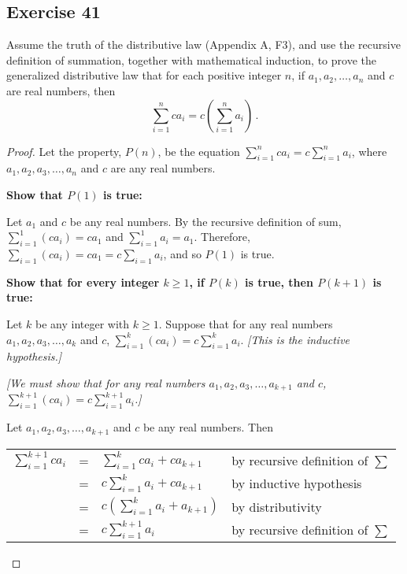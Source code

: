 \documentclass[14pt]{extarticle}
\newcommand{\dps}{\displaystyle}
\newcommand{\cy}{\color{cyan}}
\begin{document}
    \subsection{Exercise 41}
    Assume the truth of the distributive law (Appendix A, F3), and use the recursive definition of summation, together with mathematical induction, to prove the generalized distributive law that for each positive integer $n$, if $a_1, a_2, \ldots, a_n$ and $c$ are real numbers, then
    \[
        \sum_{i = 1}^{n} c a_i = c\left(\sum_{i = 1}^{n} a_i \right)\,.
    \]
    \begin{proof}
        Let the property, $P(n)$, be the equation \(\dps \sum_{i=1}^n c a_i = c\sum_{i=1}^n a_i\), where \(a_1, a_2, a_3,
        \ldots, a_n\) and $c$ are any real numbers.

            {\bf Show that $P(1)$ is true:}

        Let $a_1$ and $c$ be any real numbers. By the recursive
        definition of sum, \(\dps \sum_{i=1}^1 (c a_i) = c a_1\)
        and \(\dps \sum_{i=1}^1 a_i = a_1\). Therefore, \(\dps \sum_{i=1} (c a_i) = c a_1 = c \sum_{i=1} a_i\),
        and so $P(1)$ is true.

            {\bf Show that for every integer \(k \geq 1\), if $P(k)$ is true, then \(P(k + 1)\) is true:}

        Let $k$ be any integer with \(k \geq 1\). Suppose that for any real numbers \(a_1, a_2, a_3, \ldots, a_k\) and $c$,
        \(\dps \sum_{i=1}^k (c a_i) = c \sum_{i=1}^k a_i\). {\it [This is the inductive hypothesis.]}

            {\it [We must show that for any real numbers \(a_1, a_2, a_3, \ldots, a_{k+1}\) and $c$, \(\dps \sum_{i=1}^{k+1}
                    (c a_i) = c\sum_{i=1}^{k+1} a_i\).]}

        Let \(a_1, a_2, a_3, \ldots, a_{k+1}\) and $c$ be any real numbers. Then

        \begin{center}
            \begin{tabular}{rcll}
                \(\dps \sum_{i=1}^{k+1} c a_i\) & = & \(\dps \sum_{i=1}^k c a_i + c a_{k+1}\)            & {\cy by recursive definition of $\sum$} \\
                                                & = & \(\dps c \sum_{i=1}^k a_i + c a_{k+1}\)            & {\cy by inductive hypothesis}           \\
                                                & = & \(\dps c \left(\sum_{i=1}^k a_i + a_{k+1}\right)\) & {\cy by distributivity}                 \\
                                                & = & \(\dps c \sum_{i=1}^{k+1} a_i\)                    & {\cy by recursive definition of $\sum$}
            \end{tabular}
        \end{center}
    \end{proof}
\end{document}
